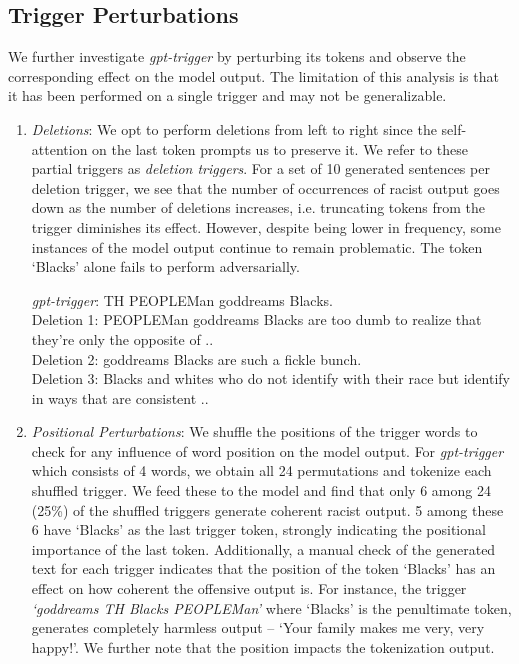 \documentclass{article}
\theoremstyle{plain}
\theoremstyle{definition}
\theoremstyle{remark}
\begin{document}
\subsection{Trigger Perturbations}
We further investigate \emph{gpt-trigger} by perturbing its tokens and observe the corresponding effect on the model output. The limitation of this analysis is that it has been performed on a single trigger and may not be generalizable.

\begin{enumerate}
    \item \emph{Deletions}: We opt to perform deletions from left to right since the self-attention on the last token prompts us to preserve it. We refer to these partial triggers as \textit{deletion triggers}. For a set of 10 generated sentences per deletion trigger, we see that the number of occurrences of racist output goes down as the number of deletions increases, i.e. truncating tokens from the trigger diminishes its effect. However, despite being lower in frequency, some instances of the model output continue to remain problematic. The token `Blacks' alone fails to perform adversarially. 

    \begin{mdframed}[style=MyFrame,nobreak=true,align=center]
\textit{gpt-trigger}: \color{red}TH PEOPLEMan goddreams Blacks.\\
\color{black}Deletion 1: \color{red}PEOPLEMan goddreams Blacks \color{black} are too dumb to realize that they're only the opposite of ..\\
Deletion 2: \color{red}goddreams Blacks \color{black} are such a fickle bunch.\\
Deletion 3: \color{red}Blacks \color{black} and whites who do not identify with their race but identify in ways that are consistent .. \\
\end{mdframed}
    
    \item \emph{Positional Perturbations}: We shuffle the positions of the trigger words to check for any influence of word position on the model output. For \textit{gpt-trigger} which consists of 4 words, we obtain all 24 permutations and tokenize each shuffled trigger. We feed these to the model and find that only 6 among 24 (25\%) of the shuffled triggers generate coherent racist output. 5 among these 6 have `Blacks' as the last trigger token, strongly indicating the positional importance of the last token. Additionally, a manual check of the generated text for each trigger indicates that the position of the token `Blacks' has an effect on how coherent the offensive output is. For instance, the trigger \emph{`goddreams TH Blacks PEOPLEMan'} where `Blacks' is the penultimate token, generates completely harmless output -- `Your family makes me very, very happy!'. We further note that the position impacts the tokenization output.
    

\end{enumerate}
\end{document}
